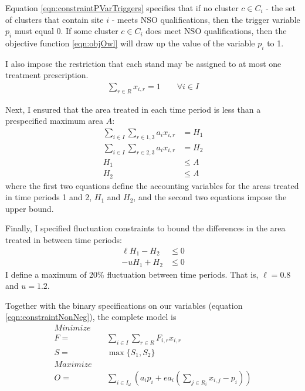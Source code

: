 Equation \eqref{eqn:constraintPVarTriggers} specifies that if no cluster $c \in C_i$ - the set of clusters that contain site $i$ - meets NSO qualifications, then the trigger variable $p_i$ must equal 0. If some cluster $c \in C_i$ does meet NSO qualifications, then the objective function \eqref{eqn:objOwl} will draw up the value of the variable $p_i$ to 1.

I also impose the restriction that each stand may be assigned to at most one treatment prescription.
\begin{align}
\sum_{r \in R} x_{i,r} = 1  \qquad \forall i \in I \label{eqn:constraintOnePrescrip}
\end{align}

Next, I ensured that the area treated in each time period is less than a prespecified maximum area $A$:
\begin{align}
\sum_{i \in I} \sum_{r \in 1,3} a_i x_{i,r} &= H_1 \label{eqn:constraintAreaAcctg1}\\
\sum_{i \in I} \sum_{r \in 2,3} a_i x_{i,r} &= H_2 \label{eqn:constraintAreaAcctg2}\\
H_1 &\le A \label{eqn:constraintAreaRestr1}\\
H_2 &\le A \label{eqn:constraintAreaRestr2}
\end{align}
where the first two equations define the accounting variables for the areas treated in time periods 1 and 2, $H_1$ and $H_2$, and the second two equations impose the upper bound.

Finally, I specified fluctuation constraints to bound the differences in the area treated in between time periods:
\begin{align}
\ell H_1 - H_2 &\le 0 \label{eqn:constraintAreaFlucL}\\
-u H_1 + H_2 &\le 0 \label{eqn:constraintAreaFlucU}
\end{align}
I define a maximum of 20\% fluctuation between time periods. That is, $\ell = 0.8$ and $u = 1.2$.

Together with the binary specifications on our variables (equation \eqref{eqn:constraintNonNeg}), the complete model is
\begin{align*}
Minimize \quad & \\
F=&\sum_{i\in I}\sum_{r\in R} F_{i,r} x_{i,r}\\
S=&\max \{S_1,S_2\}\\
Maximize \quad & \\
O=&\sum_{i\in I_\omega} \left(a_i p_i + e a_i \left( \sum_{j \in R_i} x_{i,j}-p_i \right) \right)
\end{align*}

